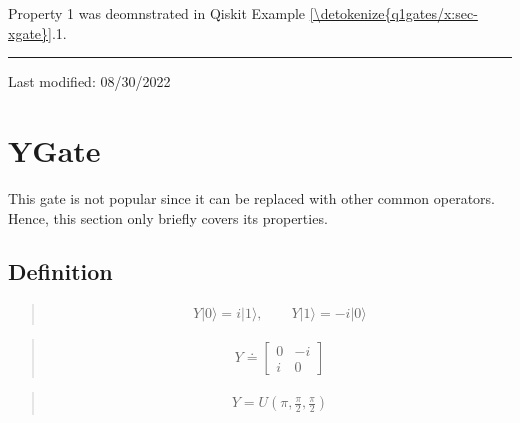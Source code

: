 \documentclass[letterpaper,10pt,english]{jupyterBook}
\begin{document}
\sphinxAtStartPar
Property 1 was deomnstrated in Qiskit Example \hyperref[\detokenize{q1gates/x:sec-xgate}]{\ref{\detokenize{q1gates/x:sec-xgate}}}.1.


\bigskip\hrule\bigskip


\sphinxAtStartPar
Last modified: 08/30/2022

\sphinxstepscope


\section{YGate}
\label{\detokenize{q1gates/y:ygate}}\label{\detokenize{q1gates/y:sec-ygate}}\label{\detokenize{q1gates/y::doc}}
\sphinxAtStartPar
This gate is not popular since it can be replaced with other common operators.  Hence, this section only briefly covers its properties.

\sphinxAtStartPar
{}


\subsection{Definition}
\label{\detokenize{q1gates/y:definition}}
\sphinxAtStartPar
{}
\begin{quote}
\begin{equation*}
\begin{split}
Y |0\rangle = i|1\rangle, \qquad Y |1\rangle = -i |0\rangle
\end{split}
\end{equation*}\end{quote}

\sphinxAtStartPar
{}
\begin{quote}
\begin{equation}\label{equation:q1gates/y:YGate-matrix}
\begin{split}
Y \doteq \begin{bmatrix} 0 & -i \\ i & 0 \end{bmatrix}
\end{split}
\end{equation}\end{quote}

\sphinxAtStartPar
{}
\begin{quote}
\begin{equation}\label{equation:q1gates/y:YGate-U}
\begin{split}
Y = U\left(\pi,\frac{\pi}{2},\frac{\pi}{2}\right)
\end{split}
\end{equation}\end{quote}
\end{document}
